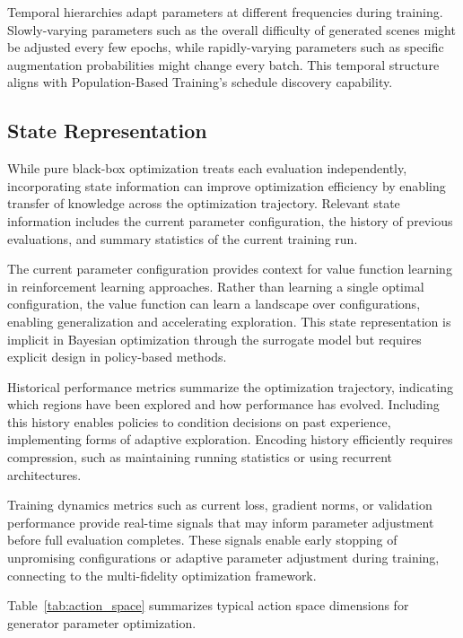 Temporal hierarchies adapt parameters at different frequencies during training. Slowly-varying parameters such as the overall difficulty of generated scenes might be adjusted every few epochs, while rapidly-varying parameters such as specific augmentation probabilities might change every batch. This temporal structure aligns with Population-Based Training's schedule discovery capability.

\subsection{State Representation}
\label{subsec:state_representation}

While pure black-box optimization treats each evaluation independently, incorporating state information can improve optimization efficiency by enabling transfer of knowledge across the optimization trajectory. Relevant state information includes the current parameter configuration, the history of previous evaluations, and summary statistics of the current training run.

The current parameter configuration provides context for value function learning in reinforcement learning approaches. Rather than learning a single optimal configuration, the value function can learn a landscape over configurations, enabling generalization and accelerating exploration. This state representation is implicit in Bayesian optimization through the surrogate model but requires explicit design in policy-based methods.

Historical performance metrics summarize the optimization trajectory, indicating which regions have been explored and how performance has evolved. Including this history enables policies to condition decisions on past experience, implementing forms of adaptive exploration. Encoding history efficiently requires compression, such as maintaining running statistics or using recurrent architectures.

Training dynamics metrics such as current loss, gradient norms, or validation performance provide real-time signals that may inform parameter adjustment before full evaluation completes. These signals enable early stopping of unpromising configurations or adaptive parameter adjustment during training, connecting to the multi-fidelity optimization framework.

Table~\ref{tab:action_space} summarizes typical action space dimensions for generator parameter optimization.

